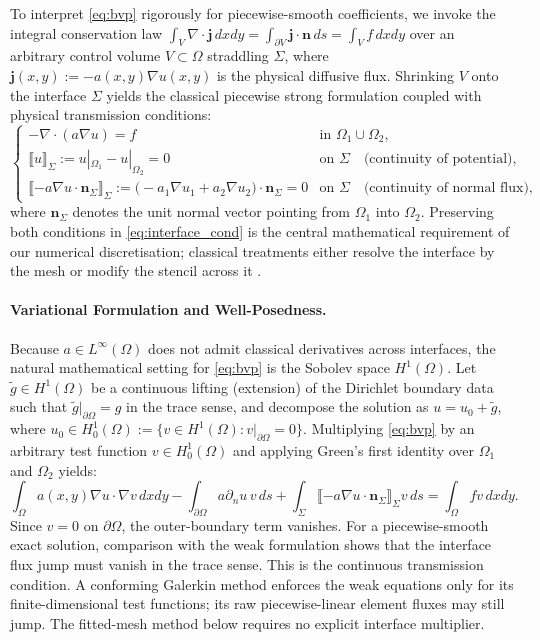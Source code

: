 \documentclass[11pt,a4paper]{article}
\theoremstyle{definition}
\theoremstyle{remark}
\begin{document}
To interpret \eqref{eq:bvp} rigorously for piecewise-smooth coefficients, we invoke the integral conservation law $\int_V \nabla\cdot\bm{j}\,dxdy = \int_{\partial V} \bm{j}\cdot\bm{n}\,ds = \int_V f\,dxdy$ over an arbitrary control volume $V \subset \Omega$ straddling $\Sigma$, where $\bm{j}(x,y) := -a(x,y)\nabla u(x,y)$ is the physical diffusive flux. Shrinking $V$ onto the interface $\Sigma$ yields the classical piecewise strong formulation coupled with physical transmission conditions:
\begin{equation}
    \begin{cases}
        -\nabla\cdot(a\nabla u) = f & \text{in } \Omega_1 \cup \Omega_2, \\[1mm]
        \llbracket u \rrbracket_\Sigma := u|_{\Omega_1} - u|_{\Omega_2} = 0 & \text{on } \Sigma \quad \text{(continuity of potential)}, \\[1mm]
        \llbracket -a\nabla u \cdot \bm{n}_\Sigma \rrbracket_\Sigma := \bigl(-a_1\nabla u_1 + a_2\nabla u_2\bigr)\cdot\bm{n}_\Sigma = 0 & \text{on } \Sigma \quad \text{(continuity of normal flux)},
    \end{cases}
    \label{eq:interface_cond}
\end{equation}
where $\bm{n}_\Sigma$ denotes the unit normal vector pointing from $\Omega_1$ into $\Omega_2$. Preserving both conditions in \eqref{eq:interface_cond} is the central mathematical requirement of our numerical discretisation; classical treatments either resolve the interface by the mesh or modify the stencil across it \cite{leveque1994imm}.

\paragraph{Variational Formulation and Well-Posedness.}
Because $a \in L^\infty(\Omega)$ does not admit classical derivatives across interfaces, the natural mathematical setting for \eqref{eq:bvp} is the Sobolev space $H^1(\Omega)$. Let $\tilde{g} \in H^1(\Omega)$ be a continuous lifting (extension) of the Dirichlet boundary data such that $\tilde{g}|_{\partial\Omega} = g$ in the trace sense, and decompose the solution as $u = u_0 + \tilde{g}$, where $u_0 \in H_0^1(\Omega) := \{v \in H^1(\Omega) : v|_{\partial\Omega} = 0\}$. Multiplying \eqref{eq:bvp} by an arbitrary test function $v \in H_0^1(\Omega)$ and applying Green's first identity over $\Omega_1$ and $\Omega_2$ yields:
\begin{equation}
    \int_\Omega a(x,y)\nabla u \cdot \nabla v \, dxdy - \int_{\partial\Omega} a\partial_n u \, v \, ds + \int_\Sigma \llbracket -a\nabla u \cdot \bm{n}_\Sigma \rrbracket_\Sigma v \, ds = \int_\Omega f v \, dxdy.
    \label{eq:green_split}
\end{equation}
Since $v=0$ on $\partial\Omega$, the outer-boundary term vanishes.
For a piecewise-smooth exact solution, comparison with the weak formulation
shows that the interface flux jump must vanish in the trace sense. This is
the continuous transmission condition. A conforming Galerkin method enforces
the weak equations only for its finite-dimensional test functions; its raw
piecewise-linear element fluxes may still jump. The fitted-mesh method below
requires no explicit interface multiplier.
\end{document}
